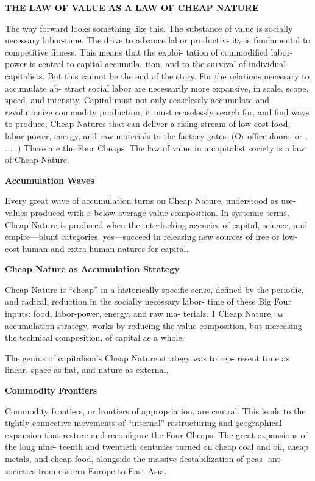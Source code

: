 \documentclass[
]{book}
\begin{document}
\textbf{THE LAW OF VALUE AS A LAW OF CHEAP NATURE}

The way forward looks something like this. The substance of value
is socially necessary labor-time. The drive to advance labor productiv-
ity is fundamental to competitive fitness. This means that the exploi-
tation of commodified labor-power is central to capital accumula-
tion, and to the survival of individual capitalists. But this cannot be
the end of the story. For the relations necessary to accumulate ab-
stract social labor are necessarily more expansive, in scale, scope,
speed, and intensity. Capital must not only ceaselessly accumulate
and revolutionize commodity production; it must ceaselessly search
for, and find ways to produce, Cheap Natures that can deliver a rising
stream of low-cost food, labor-power, energy, and raw materials to the
factory gates. (Or office doors, or . . . .) These are the Four Cheaps.
The law of value in a capitalist society is a law of Cheap Nature.

\textbf{Accumulation Waves}

Every great wave of accumulation turns on Cheap Nature, understood as use-values produced with
a below average value-composition. In systemic terms, Cheap Nature
is produced when the interlocking agencies of capital, science, and
empire---blunt categories, yes---succeed in releasing new sources of
free or low-cost human and extra-human natures for capital.

\textbf{Cheap Nature as Accumulation Strategy}

Cheap Nature is ``cheap'' in a historically specific sense, defined
by the periodic, and radical, reduction in the socially necessary labor-
time of these Big Four inputs: food, labor-power, energy, and raw ma-
terials. 1 Cheap Nature, as accumulation strategy, works by reducing
the value composition, but increasing the technical composition, of
capital as a whole.

The genius of capitalism's Cheap Nature strategy was to rep-
resent time as linear, space as flat, and nature as external.

\textbf{Commodity Frontiers}

Commodity frontiers, or frontiers of appropriation, are central.
This leads to the tightly connective movements of
``internal'' restructuring and geographical expansion that restore and
reconfigure the Four Cheaps. The great expansions of the long nine-
teenth and twentieth centuries turned on cheap coal and oil, cheap
metals, and cheap food, alongside the massive destabilization of peas-
ant societies from eastern Europe to East Asia.
\end{document}
